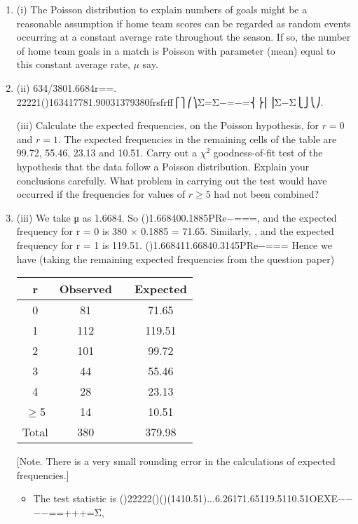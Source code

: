 \documentclass[a4paper,12pt]{article}
\begin{document}
\begin{enumerate}
    \item 
(i) The Poisson distribution to explain numbers of goals might be a reasonable assumption if home team scores can be regarded as random events occurring at a constant average rate throughout the season. If so, the number of home team goals in a match is Poisson with parameter (mean) equal to this constant average rate, $\mu$ say.
    \item  (ii) 634/3801.6684r==.
22221()163417781.90031379380frsfrff⎧⎫⎛⎞Σ=Σ−=−=⎨⎬⎜⎟Σ−Σ⎩⎭⎝⎠.
    

\newpage
\begin{framed}
(iii) Calculate the expected frequencies, on the Poisson hypothesis, for $r = 0$ and $r = 1$.  The expected frequencies in the remaining cells of the table are 99.72, 55.46, 23.13 and 10.51.  Carry out a $\chi^2$ goodness-of-fit test of the hypothesis that the data follow a Poisson distribution.  Explain your conclusions carefully.  What problem in carrying out the test would have occurred if the frequencies for values of $r \geq 5$ had not been combined? 
\end{framed}
    \item  (iii) We take μ as 1.6684. So ()1.668400.1885PRe−===, and the expected frequency for r = 0 is 380 × 0.1885 = 71.65.
Similarly, , and the expected frequency for r = 1 is 119.51. ()1.668411.66840.3145PRe−===
Hence we have (taking the remaining expected frequencies from the question paper)
\begin{center}
\begin{tabular}{|c|c|c|c|}
r	&	Observed	&		&	Expected	\\ \hline
0	&	81	&		&	71.65	\\ \hline
1	&	112	&		&	119.51	\\ \hline
2	&	101	&		&	99.72	\\ \hline
3	&	44	&		&	55.46	\\ \hline
4	&	28	&		&	23.13	\\ \hline
$\geq$5	&	14	&		&	10.51	\\ \hline
Total	&	380	&		&	379.98	\\ \hline
\end{tabular}
\end{center}
[Note. There is a very small rounding error in the calculations of expected frequencies.]

\begin{itemize}
\item The test statistic is
()22222()()(1410.51)...6.26171.65119.5110.51OEXE−−−−==+++=Σ,


\end{itemize}
\end{enumerate}
\end{document}
